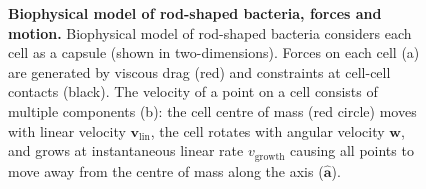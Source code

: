 \documentclass{report}
\let\oldhat\hat
\renewcommand{\vec}[1]{\mathbf{#1}}
\renewcommand{\hat}[1]{\oldhat{\mathbf{#1}}}
\let\oldcaption\caption
\renewcommand{\caption}[2][]{\oldcaption[#1]{\textbf{#1.} #2}}
\begin{document}
\begin{center}
\begin{figure}[p]\centering
{}\qquad
{}
\caption[Biophysical model of rod-shaped bacteria, forces and motion]
{Biophysical model of rod-shaped bacteria considers each cell as a capsule
(shown in two-dimensions). Forces on each cell (a) are generated by viscous drag
(red) and constraints at cell-cell contacts (black). The velocity of a point on
a cell consists of multiple components (b): the cell centre of mass (red circle)
moves with linear velocity $\vec{v}_\textrm{lin}$, the cell rotates with angular
velocity $\vec{w}$, and grows at instantaneous linear rate $v_\textrm{growth}$ causing all points to
move away from the centre of mass along the axis ($\hat{\vec{a}}$).}
\label{fig:model}
\end{figure}
\end{center}
\end{document}
